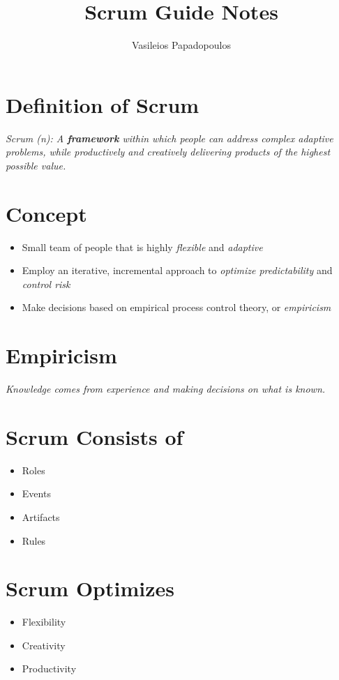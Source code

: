 \documentclass[a4paper,11pt,twocolumn]{article}
\title{\textbf{Scrum Guide Notes} \vspace{-2ex}}
\author{Vasileios Papadopoulos}
\date{}
\begin{document}
\maketitle

\thispagestyle{fancy}

\section*{Definition of Scrum}
\textit{Scrum (n): A \textbf{framework} within which people can address complex adaptive problems, while productively and creatively delivering products of the highest possible value.}

\section*{Concept}
\begin{itemize}
	\item Small team of people that is highly \textit{flexible} and \textit{adaptive}
	\item Employ an iterative, incremental approach to \textit{optimize predictability} and \textit{control risk}
	\item Make decisions based on empirical process control theory, or \textit{empiricism}
\end{itemize}

\section*{Empiricism}
\textit{Knowledge comes from experience and making decisions on what is known.}

\section*{Scrum Consists of}
\begin{itemize}
	\item Roles
	\item Events
	\item Artifacts
	\item Rules
\end{itemize}

\section*{Scrum Optimizes}
\begin{itemize}
	\item Flexibility
	\item Creativity
	\item Productivity
\end{itemize}
\end{document}
